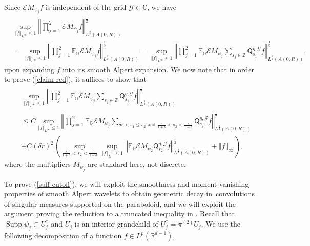 \documentclass{amsart}%
\theoremstyle{plain}
\numberwithin{equation}{section}
\begin{document}
Since $\mathcal{E}M_{\psi_{j}}f$ is independent of the grid $\mathcal{G}%
\in\mathbb{G}$, we have%
\begin{align*}
& \sup_{\left\Vert f\right\Vert _{L^{\infty}}\leq1}\left\Vert \prod_{j=1}%
^{2}\mathcal{E}M_{\psi_{j}}f\right\Vert _{L^{\frac{q}{2}}\left(  A\left(
0,R\right)  \right)  }^{\frac{1}{2}}\\
& =\sup_{\left\Vert f\right\Vert _{L^{\infty}}\leq1}\left\Vert \prod_{j=1}%
^{2}\mathbb{E}_{\mathbb{G}}\mathcal{E}M_{\psi_{j}}f\right\Vert _{L^{\frac
{q}{2}}\left(  A\left(  0,R\right)  \right)  }^{\frac{1}{2}}=\sup_{\left\Vert
f\right\Vert _{L^{\infty}}\leq1}\left\Vert \prod_{j=1}^{2}\mathbb{E}%
_{\mathbb{G}}\mathcal{E}M_{\psi_{j}}\sum_{s_{j}\in\mathbb{Z}}\mathsf{Q}%
_{s_{j}}^{\eta,\mathcal{G}}f\right\Vert _{L^{\frac{q}{2}}\left(  A\left(
0,R\right)  \right)  }^{\frac{1}{2}},
\end{align*}
upon expanding $f$ into its smooth Alpert expansion. We now note that in order
to prove (\ref{claim red}), it suffices to show that%
\begin{align}
& \sup_{\left\Vert f\right\Vert _{L^{\infty}}\leq1}\left\Vert \prod_{j=1}%
^{2}\mathbb{E}_{\mathbb{G}}\mathcal{E}M_{\psi_{j}}\sum_{s_{j}\in\mathbb{Z}%
}\mathsf{Q}_{s_{j}}^{\eta,\mathcal{G}}f\right\Vert _{L^{\frac{q}{2}}\left(
A\left(  0,R\right)  \right)  }^{\frac{1}{2}}\label{suff cutoff}\\
& \leq C\sup_{\left\Vert f\right\Vert _{L^{\infty}}\leq1}\left\Vert
\prod_{j=1}^{2}\mathbb{E}_{\mathbb{G}}\mathcal{E}M_{\psi_{j}}\sum_{\delta
r<s_{1}\leq s_{2}\text{ and }\frac{r}{1+\delta}<s_{2}<\frac{r}{1-\delta}%
}\mathsf{Q}_{s_{j}}^{\eta,\mathcal{G}}f\right\Vert _{L^{\frac{q}{2}}\left(
A\left(  0,R\right)  \right)  }^{\frac{1}{2}}\nonumber\\
& +C\left(  \delta r\right)  ^{2}\left(  \sup_{\frac{r}{1+\delta}<s_{2}%
<\frac{r}{1-\delta}}\sup_{\left\Vert f\right\Vert _{L^{\infty}}\leq
1}\left\Vert \mathbb{E}_{\mathbb{G}}\mathcal{E}M_{\psi_{2}}\mathsf{Q}_{s_{2}%
}^{\eta,\mathcal{G}}f\right\Vert _{L^{\frac{q}{2}}\left(  A\left(  0,R\right)
\right)  }^{\frac{1}{2}}+\left\Vert f\right\Vert _{\infty}\right)  ,\nonumber
\end{align}
where the multipliers $M_{\psi_{j}}$ are standard here, not discrete.

To prove (\ref{suff cutoff}), we will exploit the smoothness and moment
vanishing properties of smooth Alpert wavelets to obtain geometric decay
in\ convolutions of singular measures supported on the paraboloid, and we will
exploit the argument proving the reduction to a truncated inequality in
\cite[Subsubsection 1.4.1]{Saw7}. Recall that $\operatorname*{Supp}\psi
_{j}\subset U_{j}^{\ast}$ and $U_{j}$ is an interior grandchild of
$U_{j}^{\ast}=\pi^{\left(  2\right)  }U_{j}$. We use the following
decomposition of a function $f\in L^{p}\left(  \mathbb{R}^{d-1}\right)  $,%
\end{document}

